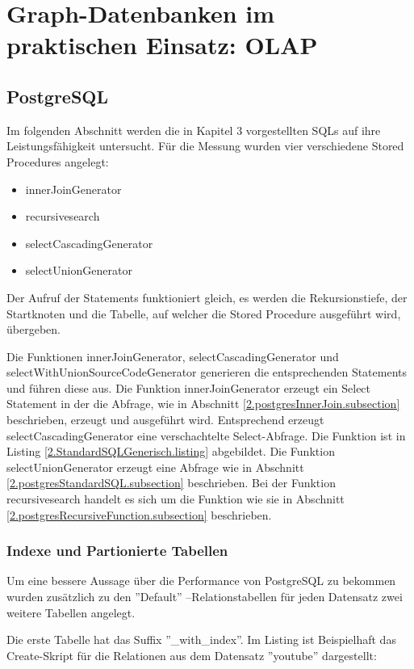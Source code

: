 \chapter{Graph-Datenbanken im praktischen Einsatz: OLAP}
\section{PostgreSQL}
Im folgenden Abschnitt werden die in Kapitel 3 vorgestellten SQLs auf ihre Leistungsfähigkeit untersucht. Für die Messung wurden vier verschiedene Stored Procedures angelegt:
\begin{itemize}
	\item innerJoinGenerator
	\item recursivesearch
	\item selectCascadingGenerator
	\item selectUnionGenerator
\end{itemize}
Der Aufruf der Statements funktioniert gleich, es werden die Rekursionstiefe, der Startknoten und die Tabelle, auf welcher die Stored Procedure ausgeführt wird, übergeben.

Die Funktionen innerJoinGenerator, selectCascadingGenerator und selectWithUnionSourceCodeGenerator generieren die entsprechenden Statements und führen diese aus. Die Funktion innerJoinGenerator erzeugt ein Select Statement in der die Abfrage, wie in Abschnitt \ref{2.postgresInnerJoin.subsection} beschrieben, erzeugt und ausgeführt wird. Entsprechend erzeugt selectCascadingGenerator eine verschachtelte Select-Abfrage. Die Funktion ist in Listing \ref{2.StandardSQLGenerisch.listing} abgebildet. Die Funktion selectUnionGenerator erzeugt eine Abfrage wie in Abschnitt \ref{2.postgresStandardSQL.subsection} beschrieben. Bei der Funktion recursivesearch handelt es sich um die Funktion wie sie in Abschnitt \ref{2.postgresRecursiveFunction.subsection} beschrieben.

\subsection{Indexe und Partionierte Tabellen}
Um eine bessere Aussage über die Performance von PostgreSQL zu bekommen wurden zusätzlich zu den ''Default'' --Relationstabellen für jeden Datensatz zwei weitere Tabellen angelegt.

Die erste Tabelle hat das Suffix ''\_with\_index''. Im Listing ist Beispielhaft das Create-Skript für die Relationen aus dem Datensatz ''youtube'' dargestellt:

